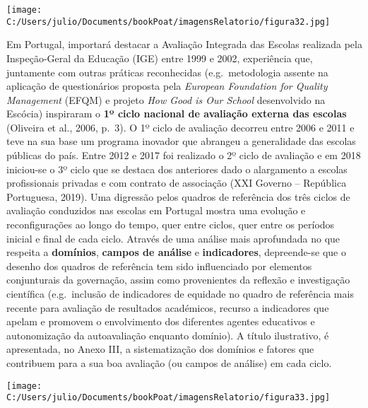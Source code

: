 \documentclass[
]{book}
\begin{document}
\texttt{[image: C:/Users/julio/Documents/bookPoat/imagensRelatorio/figura32.jpg]}

Em Portugal, importará destacar a Avaliação Integrada das Escolas realizada pela Inspeção-Geral da Educação (IGE) entre 1999 e 2002, experiência que, juntamente com outras práticas reconhecidas (e.g.~metodologia assente na aplicação de questionários proposta pela \emph{European Foundation for Quality Management} (EFQM) e projeto \emph{How Good is Our School} desenvolvido na Escócia) inspiraram o \textbf{1º ciclo nacional de avaliação externa das escolas} (Oliveira et al., 2006, p.~3). O 1º ciclo de avaliação decorreu entre 2006 e 2011 e teve na sua base um programa inovador que abrangeu a generalidade das escolas públicas do país. Entre 2012 e 2017 foi realizado o 2º ciclo de avaliação e em 2018 iniciou-se o 3º ciclo que se destaca dos anteriores dado o alargamento a escolas profissionais privadas e com contrato de associação (XXI Governo -- República Portuguesa, 2019). Uma digressão pelos quadros de referência dos três ciclos de avaliação conduzidos nas escolas em Portugal mostra uma evolução e reconfigurações ao longo do tempo, quer entre ciclos, quer entre os períodos inicial e final de cada ciclo. Através de uma análise mais aprofundada no que respeita a \textbf{domínios}, \textbf{campos de análise} e \textbf{indicadores}, depreende-se que o desenho dos quadros de referência tem sido influenciado por elementos conjunturais da governação, assim como provenientes da reflexão e investigação científica (e.g.~inclusão de indicadores de equidade no quadro de referência mais recente para avaliação de resultados académicos, recurso a indicadores que apelam e promovem o envolvimento dos diferentes agentes educativos e autonomização da autoavaliação enquanto domínio). A título ilustrativo, é apresentada, no Anexo III, a sistematização dos domínios e fatores que contribuem para a sua boa avaliação (ou campos de análise) em cada ciclo.

\texttt{[image: C:/Users/julio/Documents/bookPoat/imagensRelatorio/figura33.jpg]}
\end{document}
